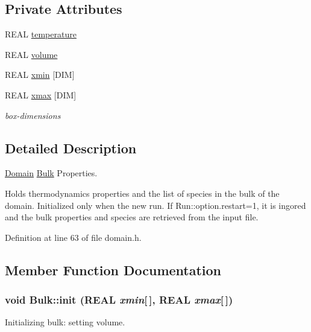 \subsection*{Private Attributes}
\begin{CompactItemize}
\item 
REAL \hyperlink{classBulk_502aae16bd537c2989f66b0553841eec}{temperature}
\item 
REAL \hyperlink{classBulk_9ffe7d1a5699e06ab7d59245f7bddcd4}{volume}
\item 
REAL \hyperlink{classBulk_5dadbb8571e0fef63e38bcc26c47637e}{xmin} \mbox{[}DIM\mbox{]}
\item 
REAL \hyperlink{classBulk_3297dbcf83d7c66815a5c713ebf1bfd4}{xmax} \mbox{[}DIM\mbox{]}
\begin{CompactList}\small\item\em box-dimensions \item\end{CompactList}\end{CompactItemize}


\subsection{Detailed Description}
\hyperlink{classDomain}{Domain} \hyperlink{classBulk}{Bulk} Properties. 

Holds thermodynamics properties and the list of species in the bulk of the domain. Initialized only when the new run. If Run::option.restart=1, it is ingored and the bulk properties and species are retrieved from the input file. 

Definition at line 63 of file domain.h.

\subsection{Member Function Documentation}
\hypertarget{classBulk_0c85c5e3ec7be306c8f5d09178647b21}{
\subsubsection[{init}]{\setlength{\rightskip}{0pt plus 5cm}void Bulk::init (REAL {\em xmin}\mbox{[}$\,$\mbox{]}, \/  REAL {\em xmax}\mbox{[}$\,$\mbox{]})}}
\label{classBulk_0c85c5e3ec7be306c8f5d09178647b21}


Initializing bulk: setting volume. 



